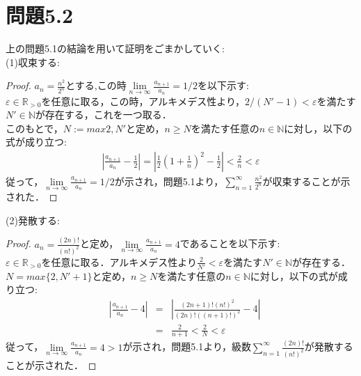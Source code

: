\documentclass{jarticle}
\begin{document}
\section*{問題5.2}
\noindent
上の問題5.1の結論を用いて証明をごまかしていく:\\
(1)収束する:\\
\begin{proof}
$a_n = \frac{n^2}{2^n}$とする,この時$\lim\limits_{n \to \infty} \frac{a_{n+1}}{a_n}=1/2$を以下示す:\\
$\varepsilon \in \mathbb{R}_{>0} $を任意に取る，この時，アルキメデス性より，$2/(N'-1) < \varepsilon$を満たす$N' \in \mathbb{N}$が存在する，これを一つ取る．\\
このもとで，$N := max{2,N'}$と定め，$n \ge N $を満たす任意の$n \in \mathbb{N}$に対し，以下の式が成り立つ:\\
\begin{equation}
\begin{aligned}
\left| \frac{a_{n+1}}{a_n} - \frac{1}{2} \right| = \left| \frac{1}{2} \left( 1+\frac{1}{n} \right)^2 - \frac{1}{2} \right| < \frac{2}{n} < \varepsilon
\end{aligned}
\end{equation}
従って，$\lim\limits_{n \to \infty} \frac{a_{n+1}}{a_n}=1/2$が示され，問題5.1より，$\sum\limits_{n=1}^{\infty} \frac{n^2}{2^n} $が収束することが示された．
\end{proof}
(2)発散する:\\
\begin{proof}
	$a_n = \frac{(2n)!}{(n!)^2}$と定め，$\lim\limits_{n \to \infty} \frac{a_{n+1}}{a_n}=4$であることを以下示す:\\
	$\varepsilon \in \mathbb{R}_{>0}$を任意に取る．アルキメデス性より$\frac{2}{N'} < \varepsilon$を満たす$N' \in \mathbb{N}$が存在する．\\
	$N= max \{2,N'+1\} $と定め，$n \ge N$を満たす任意の$n \in \mathbb{N}$に対し，以下の式が成り立つ:\\
	\begin{equation}
		\begin{aligned}
			&	\left|	\frac{a_{n+1}}{a_n}-4 \right|& = & \left| \frac{(2n+1)! (n!)^2}{(2n)!((n+1)!)^2} -4 \right| \\
			&				     & = & \frac{2}{n+1}< \frac{2}{N} <\varepsilon
		\end{aligned}
	\end{equation}
	従って，$\lim\limits_{n \to \infty} \frac{a_{n+1}}{a_n}=4>1$が示され，問題5.1より，級数$\sum\limits_{n=1}^{\infty} \frac{(2n)!}{(n!)^2}$が発散することが示された．
\end{proof}
\end{document}
